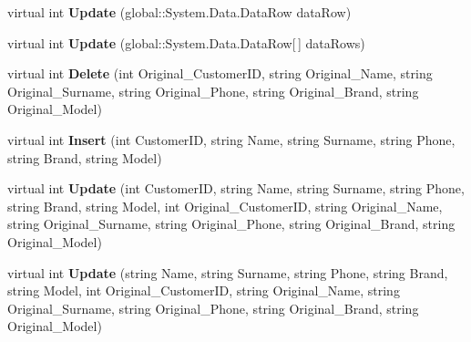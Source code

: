 \begin{DoxyCompactItemize}
\mbox{\label{classprojekt__grupowy_1_1database_data_set_table_adapters_1_1_table_table_adapter_a0ba343619ac2126cb0030d37ebe48b07}} 
virtual int {\bfseries Update} (global\+::\+System.\+Data.\+Data\+Row data\+Row)
\item 
\mbox{\label{classprojekt__grupowy_1_1database_data_set_table_adapters_1_1_table_table_adapter_a2b4a5f38949b32b8739c9b76baa5357b}} 
virtual int {\bfseries Update} (global\+::\+System.\+Data.\+Data\+Row\mbox{[}$\,$\mbox{]} data\+Rows)
\item 
\mbox{\label{classprojekt__grupowy_1_1database_data_set_table_adapters_1_1_table_table_adapter_ac64668e5af22effed944357e78c42d83}} 
virtual int {\bfseries Delete} (int Original\+\_\+\+Customer\+ID, string Original\+\_\+\+Name, string Original\+\_\+\+Surname, string Original\+\_\+\+Phone, string Original\+\_\+\+Brand, string Original\+\_\+\+Model)
\item 
\mbox{\label{classprojekt__grupowy_1_1database_data_set_table_adapters_1_1_table_table_adapter_a4db11105cace274066c275f9118fae26}} 
virtual int {\bfseries Insert} (int Customer\+ID, string Name, string Surname, string Phone, string Brand, string Model)
\item 
\mbox{\label{classprojekt__grupowy_1_1database_data_set_table_adapters_1_1_table_table_adapter_a4981ba25dd25262541d005be45a18772}} 
virtual int {\bfseries Update} (int Customer\+ID, string Name, string Surname, string Phone, string Brand, string Model, int Original\+\_\+\+Customer\+ID, string Original\+\_\+\+Name, string Original\+\_\+\+Surname, string Original\+\_\+\+Phone, string Original\+\_\+\+Brand, string Original\+\_\+\+Model)
\item 
\mbox{\label{classprojekt__grupowy_1_1database_data_set_table_adapters_1_1_table_table_adapter_a9f9377d4e6fec08065bed93c19395725}} 
virtual int {\bfseries Update} (string Name, string Surname, string Phone, string Brand, string Model, int Original\+\_\+\+Customer\+ID, string Original\+\_\+\+Name, string Original\+\_\+\+Surname, string Original\+\_\+\+Phone, string Original\+\_\+\+Brand, string Original\+\_\+\+Model)
\end{DoxyCompactItemize}
